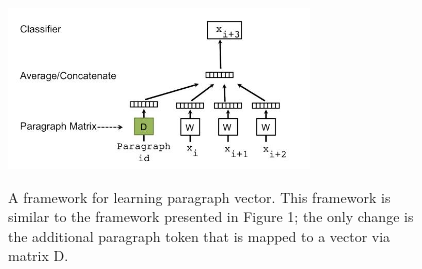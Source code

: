 \begin{figure}[h]
	\centering
	\includegraphics[width=8cm, height=5cm]{para}
	\caption[]{A framework for learning paragraph vector. This framework
		is similar to the framework presented in Figure 1; the only
		change is the additional paragraph token that is mapped to a vector
		via matrix D.}
	\label{fig:doc2vec model}
\end{figure}




	